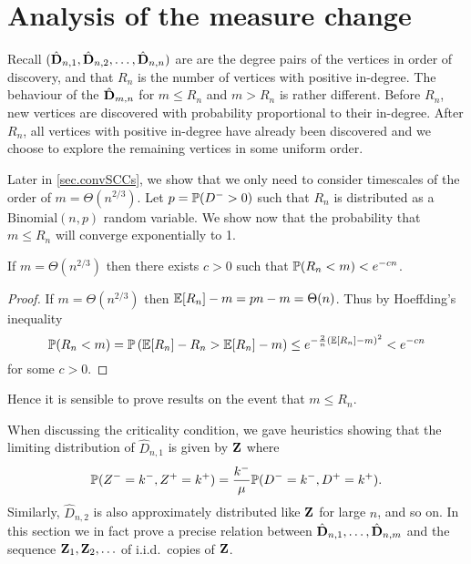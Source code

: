 \section{Analysis of the measure change}
\label{sec:measure-change}

Recall $(\hat{\vD}_{n, 1}, \hat{\vD}_{n, 2}, \ldots, \hat{\vD}_{n, n})$ are are the degree pairs of the vertices in order of discovery, and that $R_n$ is the number of vertices with positive in-degree. The behaviour of the $\hat{\vD}_{m, n}$ for $m \leq R_n$ and $m > R_n$ is rather different. Before $R_n$, new vertices are discovered with probability proportional to their in-degree. After $R_n$, all vertices with positive in-degree have already been discovered and we choose to explore the remaining vertices in some uniform order.

Later in \cref{sec.convSCCs}, we show that we only need to consider timescales of the order of $m = \Theta(n^{2/3})$. Let $p = \P(D^- > 0)$ such that $R_n$ is distributed as a $\text{Binomial}(n, p)$ random variable. We show now that the probability that $m \leq R_n$ will converge exponentially to 1.
\begin{lemma}
    If $m = \Theta(n^{2/3})$ then there exists $c > 0$ such that $\P(R_n < m) < e^{-c n}$.
\end{lemma}
\begin{proof}
    If $m = \Theta(n^{2/3})$ then $\E[R_n] - m = pn - m = \Theta(n)$. Thus by Hoeffding's inequality
    \begin{equation*}
        \P(R_n < m)
        = \P\left(\E[R_n] - R_n > \E[R_n] - m\right)
        \leq e^{-\frac{2}{n} (\E[R_n] - m)^2} < e^{-cn}
    \end{equation*}
    for some $c > 0$.
\end{proof}
Hence it is sensible to prove results on the event that $m \leq R_n$.

When discussing the criticality condition, we gave heuristics showing that the limiting distribution of $\hat{D}_{n, 1}$ is given by $\vZ$ where
\begin{equation*}
    \P(Z^- = k^-, Z^+ = k^+) = \frac{k^-}{\mu}\P(D^- = k^-, D^+ = k^+).
\end{equation*}
Similarly, $\hat{D}_{n, 2}$ is also approximately distributed like $\vZ$ for large $n$, and so on. In this section we in fact prove a precise relation between $\hat{\vD}_{n, 1}, \ldots, \hat{\vD}_{n, m}$ and the sequence $\vZ_1, \vZ_2, \ldots$ of i.i.d.\ copies of $\vZ$.

